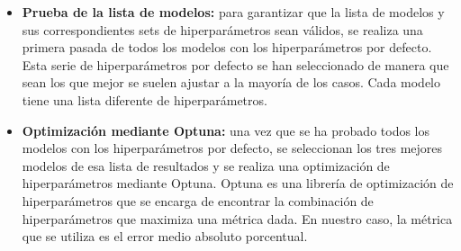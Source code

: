 \begin{itemize}
    \item \textbf{Prueba de la lista de modelos:} para garantizar que la lista
    de modelos y sus correspondientes sets de hiperparámetros sean válidos, se
    realiza una primera pasada de todos los modelos con los hiperparámetros por defecto.
    Esta serie de hiperparámetros por defecto se han seleccionado de manera que sean
    los que mejor se suelen ajustar a la mayoría de los casos. Cada modelo tiene una
    lista diferente de hiperparámetros.
    \item \textbf{Optimización mediante Optuna:} una vez que se ha probado todos los modelos
    con los hiperparámetros por defecto, se seleccionan los tres mejores modelos de esa lista
    de resultados y se realiza una optimización de hiperparámetros mediante Optuna. Optuna
    es una librería de optimización de hiperparámetros que se encarga de encontrar la combinación
    de hiperparámetros que maximiza una métrica dada. En nuestro caso, la métrica que se
    utiliza es el error medio absoluto porcentual.
\end{itemize}

